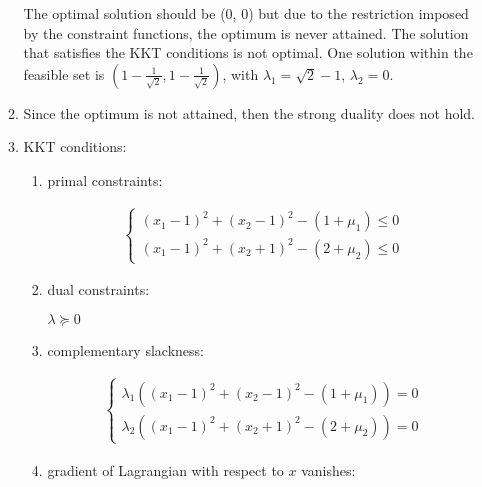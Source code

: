 \documentclass[11pt, letterpaper, titlepage]{article}
\begin{document}
\begin{enumerate}
\begin{enumerate}
        The optimal solution should be (0, 0) but due to the restriction imposed by the constraint functions, the optimum is never attained. The solution that satisfies the KKT conditions is not optimal. One solution within the feasible set is $(1 - \frac{1}{\sqrt{2}}, 1 - \frac{1}{\sqrt{2}})$, with $\lambda_1 = \sqrt{2} - 1$, $\lambda_2 = 0$.
        
        \item %
        
        Since the optimum is not attained, then the strong duality does not hold.
        
        \item %
        
        KKT conditions:
        
        \begin{enumerate}
            
            \item primal constraints: 
            
            \begin{gather*}
                \begin{cases}
                (x_1 - 1)^2 + (x_2 - 1)^2 - (1 + \mu_1) \leq 0 \\
                (x_1 - 1)^2 + (x_2 + 1)^2 - (2 + \mu_2) \leq 0
                \end{cases}
            \end{gather*}
            
            
            \item dual constraints: 
            
            $\lambda \succeq 0$
            
            \item complementary slackness: 
            
            \begin{gather*}
                \begin{cases}
                    \lambda_1((x_1 - 1)^2 + (x_2 - 1)^2 - (1 + \mu_1)) = 0 \\
                    \lambda_2((x_1 - 1)^2 + (x_2 + 1)^2 - (2 + \mu_2)) = 0
                \end{cases}
            \end{gather*}
            
            \item gradient of Lagrangian with respect to $x$ vanishes:
            

\end{enumerate}
\end{enumerate}
\end{enumerate}
\end{document}
